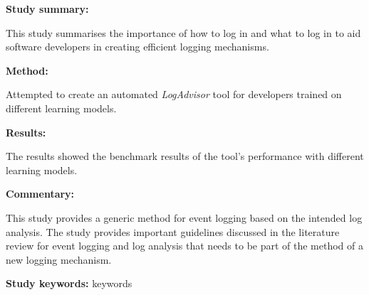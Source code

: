 \begin{tcolorbox}[colback=gray!5!white, colframe=pastelgreen!40!black, title=Learning to Log: Helping Developers Make Informed Logging Decisions \cite{Zhu2015}]
	\begin{minipage}[t]{0.25\textwidth}
		\textbf{Study summary:}
	\end{minipage}
	\hfill
	\begin{minipage}[t]{0.65\textwidth}
		This study summarises the importance of how to log in and what to log in to aid software
		developers in creating efficient logging mechanisms. 
	\end{minipage}

	\vspace{0.75em} 

	\begin{minipage}[t]{0.25\textwidth}
		\textbf{Method:}
	\end{minipage}
	\hfill
	\begin{minipage}[t]{0.65\textwidth}
		Attempted to create an automated \textit{LogAdvisor} tool for developers trained on different learning models.
	\end{minipage}

	\vspace{0.75em} 

	\begin{minipage}[t]{0.25\textwidth}
		\textbf{Results:}
	\end{minipage}
	\hfill
	\begin{minipage}[t]{0.65\textwidth}
		The results showed the benchmark results of the tool's performance with different learning models.
	\end{minipage}

	\vspace{0.75em} 

	\begin{minipage}[t]{0.25\textwidth}
		\textbf{Commentary:}
	\end{minipage}
	\hfill
	\begin{minipage}[t]{0.65\textwidth}
		This study provides a generic method for event logging based on the intended log analysis.
		The study provides important guidelines discussed in the literature review for event logging
		and log analysis that needs to be part of the method of a new logging mechanism.
	\end{minipage}
	\tcblower
	\textbf{Study keywords:} keywords
\end{tcolorbox}


